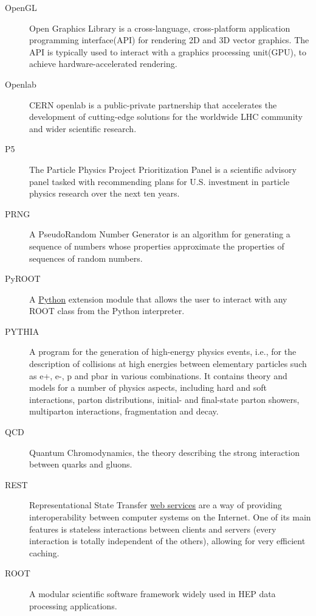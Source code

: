 \documentclass[twocolumn]{svjour3}          %
\begin{document}
\begin{appendices}
\begin{description}
\item[OpenGL] Open Graphics Library is a cross-language, cross-platform
application programming interface(API) for rendering 2D and 3D vector
graphics. The API is typically used to interact with a graphics
processing unit(GPU), to achieve hardware-accelerated rendering.

\item[Openlab] CERN openlab is a public-private partnership that accelerates
the development of cutting-edge solutions for the worldwide LHC
community and wider scientific research.

\item[P5] The Particle Physics Project Prioritization Panel is a scientific
advisory panel tasked with recommending plans for U.S. investment in
particle physics research over the next ten years.

\item[PRNG] A PseudoRandom Number Generator is an algorithm for generating a
sequence of numbers whose properties approximate the properties of
sequences of random numbers.

\item[PyROOT] A \href{http://www.python.org/}{Python} extension module that
allows the user to interact with any ROOT class from the Python
interpreter.

\item[PYTHIA] A program for the generation of high-energy physics events, i.e.,
for the description of collisions at high energies between elementary
particles such as e+, e-, p and pbar in various combinations. It
contains theory and models for a number of physics aspects, including
hard and soft interactions, parton distributions, initial- and
final-state parton showers, multiparton interactions, fragmentation and
decay.

\item[QCD] Quantum Chromodynamics, the theory describing the strong
interaction between quarks and gluons.

\item[REST] Representational State Transfer
\href{https://en.wikipedia.org/wiki/Web_service}{web services} are a way
of providing interoperability between computer systems on the Internet.
One of its main features is stateless interactions between clients and
servers (every interaction is totally independent of the others),
allowing for very efficient caching.

\item[ROOT] A modular scientific software framework widely used in HEP data
processing applications.


\end{description}
\end{appendices}
\end{document}
